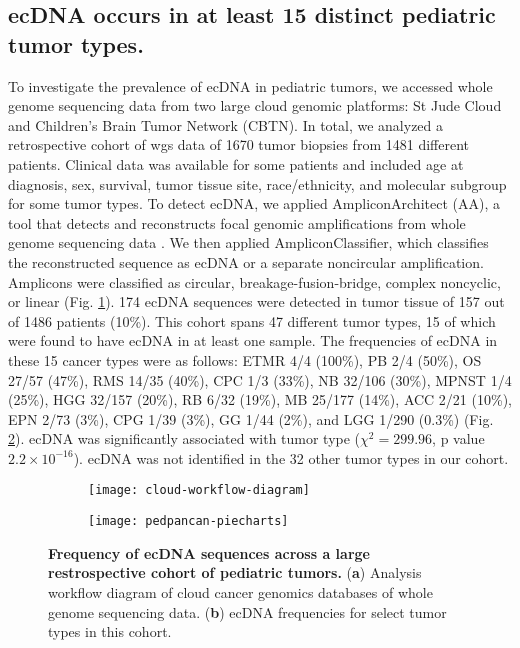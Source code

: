 \subsection{ecDNA occurs in at least 15 distinct pediatric tumor types.}

To investigate the prevalence of ecDNA in pediatric tumors, we accessed whole genome sequencing data from two large cloud genomic platforms: St Jude Cloud and Children’s Brain Tumor Network (CBTN). In total, we analyzed a retrospective cohort of \gls{wgs} data of 1670 tumor biopsies from 1481 different patients. Clinical data was available for some patients and included age at diagnosis, sex, survival, tumor tissue site, race/ethnicity, and molecular subgroup for some tumor types. To detect ecDNA, we applied AmpliconArchitect (AA), a tool that detects and reconstructs focal genomic amplifications from whole genome sequencing data \cite{AA}. We then applied AmpliconClassifier, which classifies the reconstructed sequence as ecDNA or a separate noncircular amplification. Amplicons were classified as circular, breakage-fusion-bridge, complex noncyclic, or linear (Fig. \ref{subfig:cloud-workflow-diagram}). 174 ecDNA sequences were detected in tumor tissue of 157 out of 1486 patients (10\%). This cohort spans 47 different tumor types, 15 of which were found to have ecDNA in at least one sample. The frequencies of ecDNA in these 15 cancer types were as follows: \acrfull{ETMR} 4/4 (100\%), \acrfull{PB} 2/4 (50\%), \acrfull{OS} 27/57 (47\%), \acrfull{RMS} 14/35 (40\%), \acrfull{CPC} 1/3 (33\%), \acrfull{NB} 32/106 (30\%), \acrfull{MPNST} 1/4 (25\%), \acrfull{HGG} 32/157 (20\%), \acrfull{RB} 6/32 (19\%), \acrfull{MB} 25/177 (14\%), \acrfull{ACC} 2/21 (10\%), \acrfull{EPN} 2/73 (3\%), \acrfull{CPG} 1/39 (3\%), \acrfull{GG} 1/44 (2\%), and \acrfull{LGG} 1/290 (0.3\%) (Fig. \ref{subfig:pedpancan-piecharts}). ecDNA was significantly associated with tumor type ($\chi^2 = 299.96$, p value $2.2\times10^{-16}$).  ecDNA was not identified in the 32 other tumor types in our cohort.

\begin{figure}[!h]
    \centering
    \begin{subfigure}{\textwidth}
        \centering
        \texttt{[image: cloud-workflow-diagram]}
        \caption{}
        \label{subfig:cloud-workflow-diagram}
    \end{subfigure}
    \begin{subfigure}{\textwidth}
        \centering
        \texttt{[image: pedpancan-piecharts]}
        \caption{}
        \label{subfig:pedpancan-piecharts}
    \end{subfigure}
    \caption[Frequency of ecDNA sequences across a large restrospective cohort of pediatric tumors.]{\textbf{Frequency of ecDNA sequences across a large restrospective cohort of pediatric tumors.} (\textbf{a}) Analysis workflow diagram of cloud cancer genomics databases of whole genome sequencing data. (\textbf{b}) ecDNA frequencies for select tumor types in this cohort.}
    \label{fig:frequency-pedpancan}
\end{figure}

